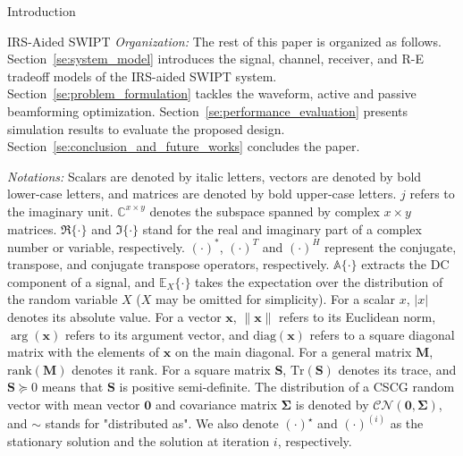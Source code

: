 \documentclass[journal]{IEEEtran}
\begin{document}
\begin{section}{Introduction}
\begin{subsection}{IRS-Aided SWIPT}
			\textit{Organization:} The rest of this paper is organized as follows. Section~\ref{se:system_model} introduces the signal, channel, receiver, and R-E tradeoff models of the IRS-aided SWIPT system. Section~\ref{se:problem_formulation} tackles the waveform, active and passive beamforming optimization. Section~\ref{se:performance_evaluation} presents simulation results to evaluate the proposed design. Section~\ref{se:conclusion_and_future_works} concludes the paper.

			\textit{Notations:} Scalars are denoted by italic letters, vectors are denoted by bold lower-case letters, and matrices are denoted by bold upper-case letters. $j$ refers to the imaginary unit. $\mathbb{C}^{x \times y}$ denotes the subspace spanned by complex $x \times y$ matrices. $\Re\{\cdot\}$ and $\Im\{\cdot\}$ stand for the real and imaginary part of a complex number or variable, respectively. $(\cdot)^*$, $(\cdot)^T$ and $(\cdot)^H$ represent the conjugate, transpose, and conjugate transpose operators, respectively. $\mathbb{A}\{\cdot\}$ extracts the DC component of a signal, and $\mathbb{E}_X\{\cdot\}$ takes the expectation over the distribution of the random variable $X$ ($X$ may be omitted for simplicity). For a scalar $x$, $\lvert{x}\rvert$ denotes its absolute value. For a vector $\boldsymbol{x}$, $\lVert{\boldsymbol{x}}\rVert$ refers to its Euclidean norm, $\arg(\boldsymbol{x})$ refers to its argument vector, and $\mathrm{diag}(\boldsymbol{x})$ refers to a square diagonal matrix with the elements of $\boldsymbol{x}$ on the main diagonal. For a general matrix $\boldsymbol{M}$, $\mathrm{rank}(\boldsymbol{M})$ denotes it rank. For a square matrix $\boldsymbol{S}$, $\mathrm{Tr}(\boldsymbol{S})$ denotes its trace, and $\boldsymbol{S} \succeq 0$ means that $\boldsymbol{S}$ is positive semi-definite. The distribution of a CSCG random vector with mean vector $\boldsymbol{0}$ and covariance matrix $\boldsymbol{\Sigma}$ is denoted by $\mathcal{CN}(\boldsymbol{0},\boldsymbol{\Sigma})$, and $\sim$ stands for "distributed as". We also denote $(\cdot)^{\star}$ and $(\cdot)^{(i)}$ as the stationary solution and the solution at iteration $i$, respectively.
		\end{subsection}
	\end{section}
\end{document}
